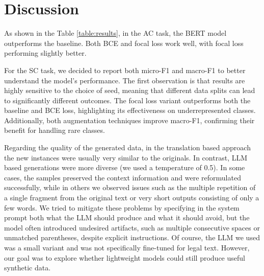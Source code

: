 \documentclass[11pt]{article}
\begin{document}
\section{Discussion}
\label{sec:discussion}


As shown in the Table \ref{table:results}, in the AC task, the BERT model outperforms the baseline. Both BCE and focal loss work well, with focal loss performing slightly better.  

For the SC task, we decided to report both micro-F1 and macro-F1 to better understand the model’s performance. The first observation is that results are highly sensitive to the choice of seed, meaning that different data splits can lead to significantly different outcomes. The focal loss variant outperforms both the baseline and BCE loss, highlighting its effectiveness on underrepresented classes. Additionally, both augmentation techniques improve macro-F1, confirming their benefit for handling rare classes.

Regarding the quality of the generated data, in the translation based approach the new instances were usually very similar to the originals. In contrast, LLM based generations were more diverse (we used a temperature of 0.5). In some cases, the samples preserved the context information and were reformulated successfully, while in others we observed issues such as the multiple repetition of a single fragment from the original text or very short outputs consisting of only a few words. We tried to mitigate these problems by specifying in the system prompt both what the LLM should produce and what it should avoid, but the model often introduced undesired artifacts, such as multiple consecutive spaces or unmatched parentheses, despite explicit instructions. Of course, the LLM we used was a small variant and was not specifically fine-tuned for legal text. However, our goal was to explore whether lightweight models could still produce useful synthetic data.
\end{document}

